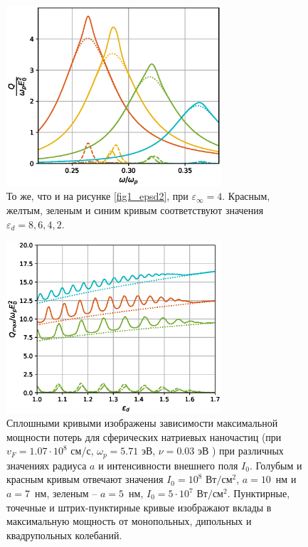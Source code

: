 \documentclass[12pt, a4paper]{article}
\def \eps {\varepsilon}
\def \w {\omega}
\begin{document}
\newpage
\begin{figure}[h]
	\centering
	\includegraphics[width=80mm]{./image/fig1_epsd4.eps}
	\caption{ То же, что и на рисунке \ref{fig1_epsd2}, при $\eps_\infty= 4$. Красным, желтым, зеленым и синим кривым соответствуют значения $\eps_d = 8, 6, 4, 2$.}
	\label{fig1_epsd4}
\end{figure} 
\newpage
\begin{figure}[h]
	\centering
	\includegraphics[width=80mm]{./image/natr2.eps}
	\caption{Сплошными кривыми изображены зависимости максимальной мощности потерь для сферических натриевых наночастиц (при $v_F = 1.07\cdot10^8$ см/с, $\w_p = 5.71$ эВ, $\nu = 0.03$ эВ \cite{ Blaber2009}) при различных значениях радиуса $a$ и интенсивности внешнего поля $I_0$. Голубым и красным кривым отвечают значения $I_0=10^8$ $\text{Вт}/\text{см}^2$, $a=10$~нм и $a=7$~нм, зеленым -- $a = 5$~нм, $I_0=5 \cdot 10^7$ $\text{Вт}/\text{см}^2$. Пунктирные, точечные и штрих-пунктирные кривые изображают вклады в максимальную мощность от монопольных, дипольных и квадрупольных колебаний.}

	\label{natr}
\end{figure} 
\end{document}
